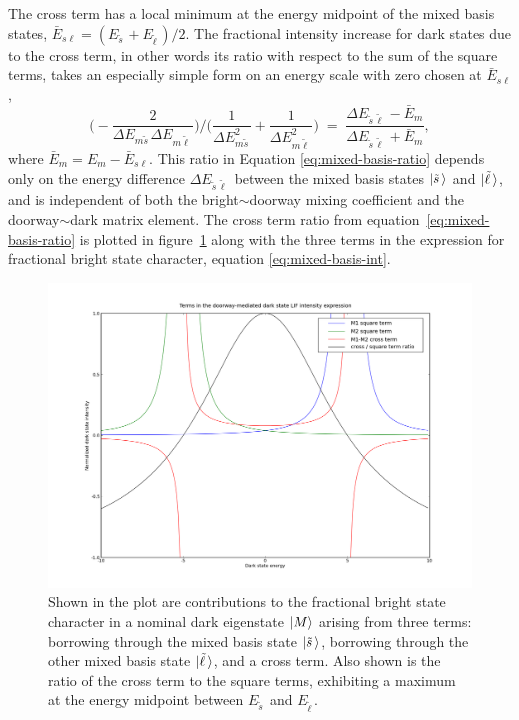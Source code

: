 \documentclass[12pt]{mitthesis}
\newcommand{\ts}{\tilde{s}\,}
\newcommand{\tl}{\tilde{\ell}\,}
\begin{document}
The cross term has a local minimum at the energy midpoint of the mixed
basis states, $\bar{E}_{s \ell} = (E_{\ts} + E_{\tl})/2$. The
fractional intensity increase for dark states due to the cross term,
in other words its ratio with respect to the sum of the square terms,
takes an especially simple form on an energy scale with zero chosen at
$\bar{E}_{s \ell}$,
\begin{equation}
  \label{eq:mixed-basis-ratio}
  \biggl( - \frac{2}{\Delta E_{m \ts} \Delta E_{m \tl}} \biggr) / 
  \biggl( \frac{1}{\Delta E_{m \ts}^2} +\frac{1}{\Delta E_{m \tl}^2} \biggr)
  \; = \; \frac{\Delta E_{\ts \tl} - \bar{E}_m}{\Delta E_{\ts \tl} + \bar{E}_m},
\end{equation}
where $\bar{E}_m = E_m - \bar{E}_{s \ell}$.  This ratio in Equation
\ref{eq:mixed-basis-ratio} depends only on the energy difference
$\Delta E_{\ts\tl}$ between the mixed basis states $\ket{\ts}$ and
$\ket{\tl}$, and is independent of both the bright$\sim$doorway mixing
coefficient and the doorway$\sim$dark matrix element.  The cross term
ratio from equation~\ref{eq:mixed-basis-ratio} is plotted in
figure~\ref{fig:local-cross-term} along with the three terms in the
expression for fractional bright state character, equation
\ref{eq:mixed-basis-int}.

\begin{figure}
  \caption{Shown in the plot are contributions to the fractional
    bright state character in a nominal dark eigenstate $\mathinner{|{M}\rangle}$
    arising from three terms: borrowing through the mixed basis state
    $\ket{\ts}$, borrowing through the other mixed basis state
    $\ket{\tl}$, and a cross term.  Also shown is the ratio of the
    cross term to the square terms, exhibiting a maximum at the energy
    midpoint between $E_{\ts}$ and $E_{\tl}$.}
  \label{fig:local-cross-term}
  \includegraphics[width=8in, angle=90]{local-doorway-terms.png}
\end{figure}
\end{document}
